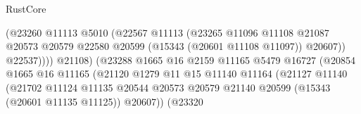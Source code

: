 \begin{lexlean}{RustCore}
\begin{coremodule}
                                                (@23260
                                                  @11113
                                                  @5010
                                                  (@22567
                                                    @11113
                                                    (@23265
                                                      @11096
                                                      @11108
                                                      @21087
                                                      @20573
                                                      @20579
                                                      @22580
                                                      @20599
                                                      (@15343 (@20601 @11108 @11097))
                                                      @20607))
                                                  @22537))))
                                          @21108)
                                        (@23288
                                          @1665
                                          @16
                                          @2159
                                          @11165
                                          @5479
                                          @16727
                                          (@20854
                                            @1665
                                            @16
                                            @11165
                                            (@21120
                                              @1279
                                              @11
                                              @15
                                              @11140
                                              @11164
                                              (@21127
                                                @11140
                                                (@21702
                                                  @11124
                                                  @11135
                                                  @20544
                                                  @20573
                                                  @20579
                                                  @21140
                                                  @20599
                                                  (@15343 (@20601 @11135 @11125))
                                                  @20607))
                                              (@23320

\end{coremodule}
\end{lexlean}
